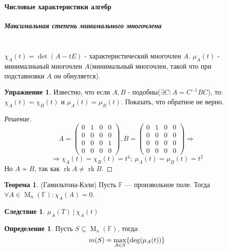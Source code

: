 \documentclass[a4paper, 14pt]{extarticle}
\theoremstyle{definition}
\newtheorem{definition}{Определение}
\newtheorem{theorem}{Теорема}
\newtheorem{conseq}{Следствие}
\newtheorem{exec}{Упражнение}
\begin{document}
\paragraph{Числовые характеристики алгебр}
\subparagraph{Максимальная степень минимального многочлена} ~\\

\(\chi_A(t) = \operatorname{det}(A - tE)\) - характеристический многочлен \(A\).
\(\mu_A(t)\) - минималньный многочлен \(A\)(минимальный многочлен, такой что при подставновки \(A\) он обнуляется).

\begin{exec}
	Известно, что если \(A, B\) - подобны(\(\exists C : A = C^{-1}BC\)), то: \(\chi_A(t) = \chi_B(t) \text{ и } \mu_A(t) = \mu_B(t)\). Показать, что обратное не верно.
\end{exec}

\begin{proof}[Решение]
	\[A = \left( 
		\begin{array}{cccc}
			0&1&0&0\\
			0&0&0&0\\
			0&0&0&1\\
			0&0&0&0
		\end{array}
	\right), B = \left(
		\begin{array}{cccc}
			0&1&0&0\\
			0&0&0&0\\
			0&0&0&0\\
			0&0&0&0
		\end{array}
	\right) \Rightarrow \]
	\[\Rightarrow \chi_A(t) = \chi_B(t) = t^4;\ \mu_A(t) =\mu_B(t) = t^2\]
	Но \(A \nsim B\), так как \(\operatorname{rk}A \neq \operatorname{rk}B\).
\end{proof}

\begin{theorem}
	(Гамильтона-Кэли) Пусть \(\mathbb{F}\) --- произвольное поле. Тогда \(\forall A \in \operatorname{M}_n(\mathbb{F}) : \chi_A(A) = 0\).
\end{theorem}

\begin{conseq}
	\(\mu_A(T)\ |\ \chi_A(t)\)
\end{conseq}

\begin{definition}
	Пусть \(S \subseteq \operatorname{M}_n(\mathbb{F})\), тогда:
	\[m(S) = \operatornamewithlimits{max}\limits_{A \in S} \{\operatornamewithlimits{deg}(\mu_A(t))\}\]
\end{definition}
\end{document}
